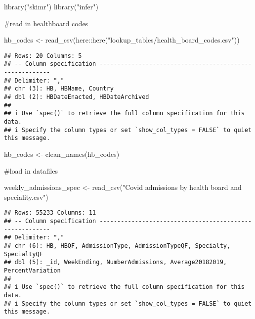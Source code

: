 \documentclass[
]{article}
\newenvironment{Shaded}{\begin{snugshade}}{\end{snugshade}}
\newcommand{\FunctionTok}[1]{\textcolor[rgb]{0.00,0.00,0.00}{#1}}
\newcommand{\NormalTok}[1]{#1}
\newcommand{\OtherTok}[1]{\textcolor[rgb]{0.56,0.35,0.01}{#1}}
\newcommand{\SpecialCharTok}[1]{\textcolor[rgb]{0.00,0.00,0.00}{#1}}
\newcommand{\StringTok}[1]{\textcolor[rgb]{0.31,0.60,0.02}{#1}}
\begin{document}
\begin{Shaded}
\begin{Highlighting}[]
\FunctionTok{library}\NormalTok{(}\StringTok{"skimr"}\NormalTok{)}
\FunctionTok{library}\NormalTok{(}\StringTok{"infer"}\NormalTok{)}
\end{Highlighting}
\end{Shaded}

\#read in healthboard codes

\begin{Shaded}
\begin{Highlighting}[]
\NormalTok{hb\_codes }\OtherTok{\textless{}{-}} \FunctionTok{read\_csv}\NormalTok{(here}\SpecialCharTok{::}\FunctionTok{here}\NormalTok{(}\StringTok{"lookup\_tables/health\_board\_codes.csv"}\NormalTok{))}
\end{Highlighting}
\end{Shaded}

\begin{verbatim}
## Rows: 20 Columns: 5
## -- Column specification --------------------------------------------------------
## Delimiter: ","
## chr (3): HB, HBName, Country
## dbl (2): HBDateEnacted, HBDateArchived
## 
## i Use `spec()` to retrieve the full column specification for this data.
## i Specify the column types or set `show_col_types = FALSE` to quiet this message.
\end{verbatim}

\begin{Shaded}
\begin{Highlighting}[]
\NormalTok{hb\_codes }\OtherTok{\textless{}{-}} \FunctionTok{clean\_names}\NormalTok{(hb\_codes)}
\end{Highlighting}
\end{Shaded}

\#load in datafiles

\begin{Shaded}
\begin{Highlighting}[]
\NormalTok{weekly\_admissions\_spec }\OtherTok{\textless{}{-}} \FunctionTok{read\_csv}\NormalTok{(}\StringTok{"Covid admissions by health board and speciality.csv"}\NormalTok{)}
\end{Highlighting}
\end{Shaded}

\begin{verbatim}
## Rows: 55233 Columns: 11
## -- Column specification --------------------------------------------------------
## Delimiter: ","
## chr (6): HB, HBQF, AdmissionType, AdmissionTypeQF, Specialty, SpecialtyQF
## dbl (5): _id, WeekEnding, NumberAdmissions, Average20182019, PercentVariation
## 
## i Use `spec()` to retrieve the full column specification for this data.
## i Specify the column types or set `show_col_types = FALSE` to quiet this message.
\end{verbatim}
\end{document}
